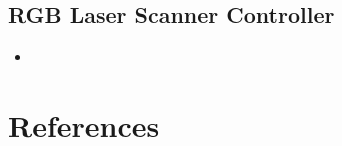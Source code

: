 \documentclass{article}
\begin{document}
\begin{spacing}{.5}
	\subsection{RGB Laser Scanner Controller}
		\begin{itemize}[label=--,itemsep=-.75ex]
			\item \large{}
		\end{itemize}

\section{References}

\end{spacing}
\end{document}
